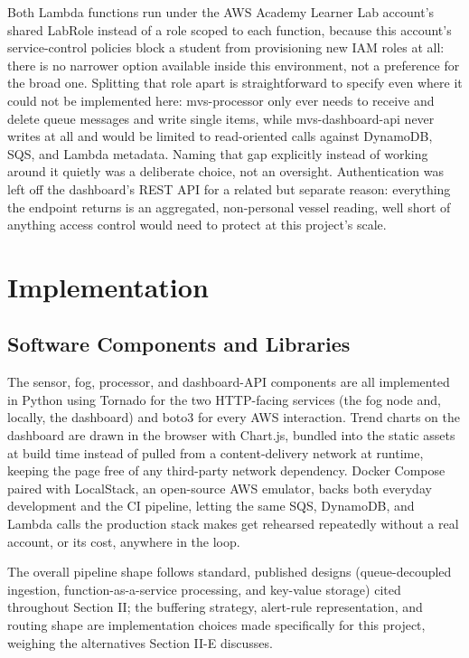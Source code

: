 \documentclass[conference]{IEEEtran}
\begin{document}
Both Lambda functions run under the AWS Academy Learner Lab account's shared LabRole instead of a role scoped to each function, because this account's service-control policies block a student from provisioning new IAM roles at all: there is no narrower option available inside this environment, not a preference for the broad one. Splitting that role apart is straightforward to specify even where it could not be implemented here: mvs-processor only ever needs to receive and delete queue messages and write single items, while mvs-dashboard-api never writes at all and would be limited to read-oriented calls against DynamoDB, SQS, and Lambda metadata. Naming that gap explicitly instead of working around it quietly was a deliberate choice, not an oversight. Authentication was left off the dashboard's REST API for a related but separate reason: everything the endpoint returns is an aggregated, non-personal vessel reading, well short of anything access control would need to protect at this project's scale.

\section{Implementation}

\subsection{Software Components and Libraries}
The sensor, fog, processor, and dashboard-API components are all implemented in Python using Tornado for the two HTTP-facing services (the fog node and, locally, the dashboard) and boto3 for every AWS interaction. Trend charts on the dashboard are drawn in the browser with Chart.js, bundled into the static assets at build time instead of pulled from a content-delivery network at runtime, keeping the page free of any third-party network dependency. Docker Compose paired with LocalStack, an open-source AWS emulator, backs both everyday development and the CI pipeline, letting the same SQS, DynamoDB, and Lambda calls the production stack makes get rehearsed repeatedly without a real account, or its cost, anywhere in the loop.

The overall pipeline shape follows standard, published designs (queue-decoupled ingestion, function-as-a-service processing, and key-value storage) cited throughout Section II; the buffering strategy, alert-rule representation, and routing shape are implementation choices made specifically for this project, weighing the alternatives Section II-E discusses.
\end{document}
